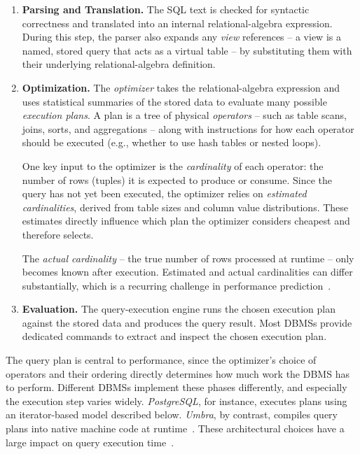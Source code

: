 \begin{enumerate}
  \item \textbf{Parsing and Translation.}
  The SQL text is checked for syntactic correctness and translated into an internal relational-algebra expression.
  During this step, the parser also expands any \emph{view} references -- a view is a named, stored query that acts as a virtual table -- by substituting them with their underlying relational-algebra definition.

  \item \textbf{Optimization.}
  The \emph{optimizer} takes the relational-algebra expression and uses statistical summaries of the stored data to evaluate many possible \emph{execution plans}.
  A plan is a tree of physical \emph{operators} -- such as table scans, joins, sorts, and aggregations -- along with instructions for how each operator should be executed (e.g., whether to use hash tables or nested loops).

  One key input to the optimizer is the \emph{cardinality} of each operator: the number of rows (tuples) it is expected to produce or consume.
  Since the query has not yet been executed, the optimizer relies on \emph{estimated cardinalities}, derived from table sizes and column value distributions.
  These estimates directly influence which plan the optimizer considers cheapest and therefore selects.

  The \emph{actual cardinality} -- the true number of rows processed at runtime -- only becomes known after execution.
  Estimated and actual cardinalities can differ substantially, which is a recurring challenge in performance prediction~\parencite{leis2018job}.

  \item \textbf{Evaluation.}
  The query-execution engine runs the chosen execution plan against the stored data and produces the query result.
  Most DBMSs provide dedicated commands to extract and inspect the chosen execution plan.
\end{enumerate}

The query plan is central to performance, since the optimizer's choice of operators and their ordering directly determines how much work the DBMS has to perform.
Different DBMSs implement these phases differently, and especially the execution step varies widely.
\emph{PostgreSQL}, for instance, executes plans using an iterator-based model described below.
\emph{Umbra}, by contrast, compiles query plans into native machine code at runtime~\parencite{umbra2020}.
These architectural choices have a large impact on query execution time~\parencite{neumann2011}.


